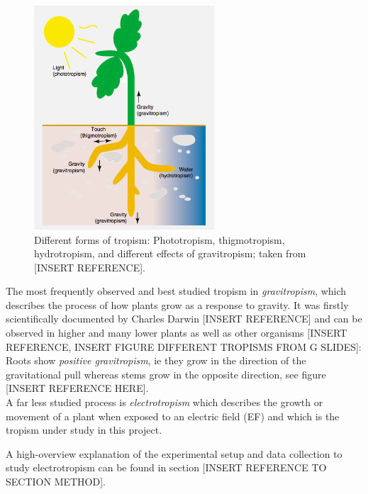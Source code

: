 \begin{figure}[h]
	\centering
	\includegraphics[width=0.6\textwidth]{../Figures/tropism.png}
	\caption{Different forms of tropism: Phototropism, thigmotropism, hydrotropism, and different effects of gravitropism; taken from [INSERT REFERENCE].}
	\label{fig:tropism}
\end{figure}

The most frequently observed and best studied tropism in \textit{gravitropism}, which describes the process of how plants grow as a response to gravity. It was firstly scientifically documented by Charles Darwin [INSERT REFERENCE] and can be observed in higher and many lower plants as well as other organisms [INSERT REFERENCE, INSERT FIGURE DIFFERENT TROPISMS FROM G SLIDES]: Roots show \textit{positive gravitropism}, ie they grow in the direction of the gravitational pull whereas stems grow in the opposite direction, see figure [INSERT REFERENCE HERE]. 
\\
A far less studied process is \textit{electrotropism} which describes the growth or movement of a plant when exposed to an electric field (EF) and which is the tropism under study in this project. 

A high-overview explanation of the experimental setup and data collection to study electrotropism can be found in section [INSERT REFERENCE TO SECTION METHOD].

